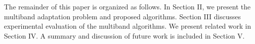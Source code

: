 
The remainder of this paper is organized as follows. In Section II, we present the multiband adaptation problem and proposed algorithms. Section III discusses experimental evaluation of the multiband algorithms. We present related work in Section IV. A summary and discussion of future work is included in Section V.

